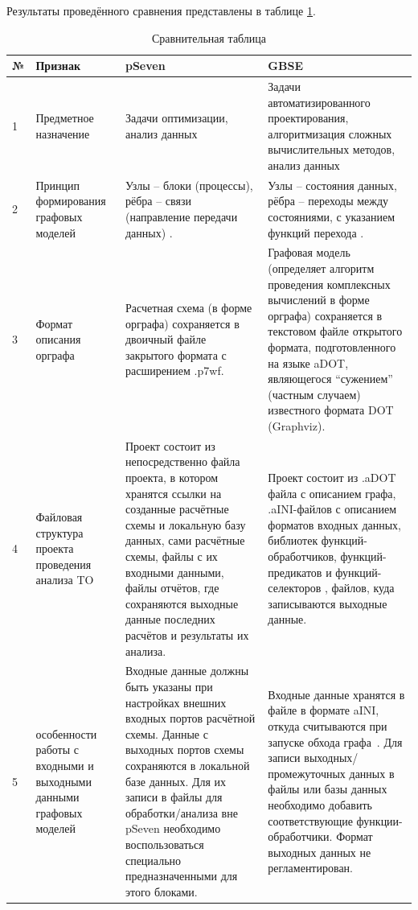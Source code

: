 \begin{landscape}

Результаты проведённого сравнения представлены в таблице \ref{rndhpcblo.0209}.

\begin{longtable}{|p{}|p{}|p{}|p{}|}
    \caption{Сравнительная таблица}\label{rndhpcblo.0209} \\
    \hline
    \textbf{№} & \textbf{Признак} & \textbf{pSeven} & \textbf{GBSE} \\
    \hline
    1 & Предметное назначение & Задачи оптимизации, анализ данных & Задачи автоматизированного проектирования, алгоритмизация сложных вычислительных методов, анализ данных \\
    \hline
    2 & Принцип формирования графовых моделей & Узлы -- блоки (процессы), рёбра -- связи (направление передачи данных) \cite{Nazarenko2015}. & Узлы -- состояния данных, рёбра -- переходы между состояниями, с указанием функций перехода \cite{SokPersh2018GBSE}. \\
    \hline
    3 & Формат описания орграфа & Расчетная схема (в форме орграфа) сохраняется в двоичный файле закрытого формата с расширением \textsf{.p7wf}. & Графовая модель (определяет алгоритм проведения комплексных вычислений в форме орграфа) сохраняется в текстовом файле открытого формата, подготовленного на языке \gls{aDOT}\cite{SokADOT}, являющегося ``сужением'' (частным случаем) известного формата DOT (Graphviz). \\
    \hline
    4 & Файловая структура проекта проведения анализа \gls{TO} & Проект состоит из непосредственно файла проекта, в котором хранятся ссылки на созданные расчётные схемы и локальную базу данных, сами расчётные схемы, файлы с их входными данными, файлы отчётов, где сохраняются выходные данные последних расчётов и результаты их анализа. & Проект состоит из \textsf{.aDOT} файла с описанием графа, \textsf{.aINI}-файлов с описанием форматов входных данных, библиотек функций-обработчиков, функций-предикатов и функций-селекторов , файлов, куда записываются выходные данные. \\
    \hline
    5 & особенности работы с входными и выходными данными графовых моделей & Входные данные должны быть указаны при настройках внешних входных портов расчётной схемы. Данные с выходных портов схемы сохраняются в локальной базе данных. Для их записи в файлы для обработки/анализа вне pSeven необходимо воспользоваться специально предназначенными для этого блоками. & Входные данные хранятся в файле в формате \gls{aINI}\cite{SokAINI}, откуда считываются при запуске обхода графа~\cite{SokPersh2017}. Для записи выходных/промежуточных данных в файлы или базы данных необходимо добавить соответствующие функции-обработчики. Формат выходных данных не регламентирован. \\

\end{longtable}
\end{landscape}
